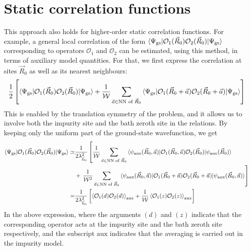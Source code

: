\documentclass[prb]{revtex4-2}
\begin{document}
\section{Static correlation functions}
This approach also holds for higher-order static correlation functions. For example, a general local correlation of the form \(\braket{\Psi_\text{gs} | \mathcal{O}_1(\vec R_0) \mathcal{O}_2(\vec R_0) | \Psi_\text{gs}}\) corresponding to operators \(\mathcal{O}_1\) and \(\mathcal{O}_2\) can be estimated, using this method, in terms of auxiliary model quantities. For that, we first express the correlation at sites \(\vec R_0\) as well as its nearest neighbours: 
\begin{equation}\begin{aligned}
	\frac{1}{2}\left[\braket{\Psi_\text{gs} | \mathcal{O}_1(\vec R_0) \mathcal{O}_2(\vec R_0) | \Psi_\text{gs}} + \frac{1}{\mathcal{W}}\sum_{\vec a \in \text{NN of }\vec R_0}\braket{\Psi_\text{gs} | \mathcal{O}_1(\vec R_0 + \vec a) \mathcal{O}_2(\vec R_0 + \vec a) | \Psi_\text{gs}}\right]
\end{aligned}\end{equation}
This is enabled by the translation symmetry of the problem, and it allows us to involve both the impurity site and the bath zeroth site in the relations. By keeping only the uniform part of the ground-state wavefunction, we get
\begin{equation}\begin{aligned}
	\label{local_correlation}
	\braket{\Psi_\text{gs} | \mathcal{O}_1(\vec R_0) \mathcal{O}_2(\vec R_0) | \Psi_\text{gs}} \simeq& \frac{1}{2\lambda_{\vec k_0}^2}\left[\frac{1}{\mathcal{W} }\sum_{\vec a \in \text{NN of }\vec R_0}\braket{\psi_\text{aux}(\vec R_0, \vec a) | \mathcal{O}_1(\vec R_0, \vec a) \mathcal{O}_2(\vec R_0) | \psi_\text{aux}(\vec R_0)} \right. \\
													   &+ \left.\frac{1}{\mathcal{W}^2}\sum_{\vec a \in \text{NN of }\vec R_0}\braket{\psi_\text{aux}(\vec R_0, \vec a) | \mathcal{O}_1(\vec R_0 + \vec a) \mathcal{O}_2(\vec R_0 + \vec a) | \psi_\text{aux}(\vec R_0, \vec a)}\right]\\
	=& \frac{1}{2\lambda_{\vec k_0}^2}\left[\braket{\mathcal{O}_1(d) \mathcal{O}_2(d)}_\text{aux} + \frac{1}{\mathcal{W}}\braket{\mathcal{O}_1(z) \mathcal{O}_2(z)}_\text{aux}\right]
\end{aligned}\end{equation}
In the above expression, where the arguments \((d)\) and \((z)\) indicate that the corresponding operator acts at the impurity site and the bath zeroth site respectively, and the subscript \(\text{aux}\) indicates that the averaging is carried out in the impurity model.
\end{document}
